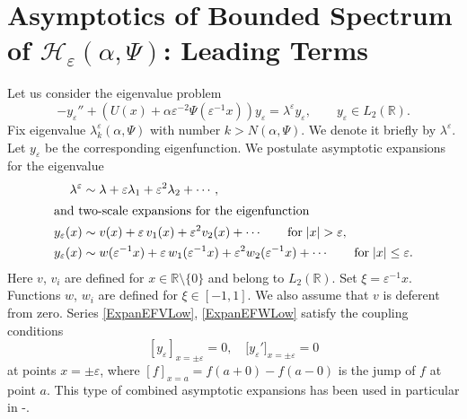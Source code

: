 \documentclass[11pt,english]{amsart}
\begin{document}
\section{Asymptotics of Bounded Spectrum of  $\mathcal{H_{\varepsilon}}(\alpha,\Psi)$: Leading Terms}\label{SectionMainTerms}
Let us  consider the eigenvalue problem
\begin{equation}\label{MainProbl}
-y_\varepsilon''+\left(U(x)+\alpha \varepsilon^{-2}\Psi(\varepsilon^{-1}x)\right)y_\varepsilon=\lambda^\varepsilon y_\varepsilon,\qquad y_\varepsilon\in L_2(\mathbb{R}).
\end{equation}
Fix  eigenvalue $\lambda_k^\varepsilon(\alpha, \Psi)$ with  number $k>N(\alpha,\Psi)$. We denote it briefly by $\lambda^\varepsilon$.
Let $y_\varepsilon$ be the corresponding eigenfunction. We postulate asymptotic expansions for the eigenvalue
\begin{align}
\label{ExpanEVLow}
    \lambda^\varepsilon & \sim \lambda+\varepsilon\lambda_1+\varepsilon^2\lambda_2+\cdots,\\
\intertext{and two-scale expansions for the eigenfunction}
   \label{ExpanEFVLow}
  y_\varepsilon(x) & \sim v(x)+\varepsilon \,v_1(x)+\varepsilon^2 v_2(x)+\cdots\qquad
  \text{for}\; {\left\vert{x}\right\vert}>\varepsilon,
 \\ y_\varepsilon(x) & \sim w(\varepsilon^{-1}x)+\varepsilon\, w_1(\varepsilon^{-1}x)+\varepsilon^2 w_2(\varepsilon^{-1}x)+
   \cdots\qquad   \text{for}\;{\left\vert{x}\right\vert}\leq\varepsilon.\label{ExpanEFWLow}
\end{align}
Here  $v$, $v_i$ are defined for $x\in\mathbb{R}\setminus \{0\}$ and belong to $L_2(\mathbb{R})$.  Set $\xi=\varepsilon^{-1}x$. Functions $w$, $w_i$ are defined for $\xi\in [-1,1]$.
We also assume that $v$ is deferent from zero.
Series \eqref{ExpanEFVLow}, \eqref{ExpanEFWLow}  satisfy
the  coupling conditions
\begin{equation}\label{CondCoupl}
\left[y_\varepsilon\right]_{x=\pm\varepsilon}=0,\quad\bigl[y_\varepsilon'\bigr]_{x=\pm\varepsilon}=0
\end{equation}
at  points  $x=\pm \varepsilon$, where $[f]_{x=a}=f(a+0)-f(a-0)$ is the jump of $f$ at point $a$. This type of combined  asymptotic expansions has been used in particular in \cite{GolovatyCR}-\cite{GolovatySMZh}.
\end{document}
